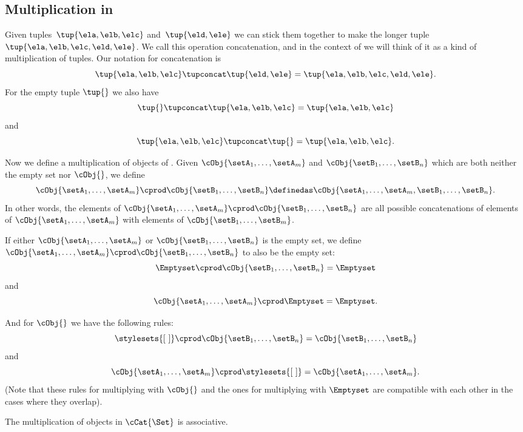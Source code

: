 \subsection{Multiplication in \cCat{\Set}}

Given tuples~$\tup{\ela, \elb, \elc}$ and~$\tup{\eld, \ele}$ we can stick them together to make the longer tuple~$\tup{\ela, \elb, \elc, \eld, \ele}$.
We call this operation concatenation, and in the context of \cCat{\Set} we will think of it as a kind of multiplication of tuples.
Our notation for concatenation is
\begin{equation*}
    \tup{\ela, \elb, \elc} \tupconcat \tup{\eld, \ele} = \tup{\ela, \elb, \elc, \eld, \ele}.
\end{equation*}
For the empty tuple $\tup{  }$ we also have
\begin{equation*}
    \tup{} \tupconcat \tup{\ela, \elb, \elc}  = \tup{\ela, \elb, \elc}
\end{equation*}
and
\begin{equation*}
    \tup{\ela, \elb, \elc}  \tupconcat \tup{ } = \tup{\ela, \elb, \elc}.
\end{equation*}

Now we define a multiplication of objects of \cCat{\Set}.
Given $\cObj{\setA_1, \dots, \setA_m}$ and $\cObj{\setB_1,  \dots, \setB_n}$ which are both neither the empty set nor $\cObj{}$, we define
\begin{equation}
    \cObj{\setA_1, \dots, \setA_m} \cprod \cObj{\setB_1, \dots, \setB_n} \definedas \cObj{\setA_1, \dots, \setA_m, \setB_1,  \dots, \setB_n}.
\end{equation}
In other words, the elements of $\cObj{\setA_1, \dots, \setA_m} \cprod \cObj{\setB_1, \dots, \setB_n}$ are all possible concatenations of elements of $\cObj{\setA_1, \dots, \setA_m}$ with elements of $\cObj{\setB_1, \dots, \setB_m}$.

If either $\cObj{\setA_1, \dots, \setA_m}$ or $\cObj{\setB_1, \dots, \setB_n}$ is the empty set, we define $\cObj{\setA_1, \dots, \setA_m} \cprod \cObj{\setB_1, \dots, \setB_n}$ to also be the empty set:
\begin{equation}
    \Emptyset \cprod \cObj{\setB_1, \dots, \setB_n} = \Emptyset
\end{equation}
and
\begin{equation}
    \cObj{\setA_1, \dots, \setA_m} \cprod \Emptyset = \Emptyset.
\end{equation}

And for $\cObj{}$ we have the following rules:
\begin{equation}
    \stylesets{[ \ ]} \cprod \cObj{\setB_1, \dots, \setB_n} = \cObj{\setB_1,  \dots, \setB_n}
\end{equation}
and
\begin{equation}
    \cObj{\setA_1, \dots, \setA_m} \cprod \stylesets{[ \ ]} = \cObj{\setA_1, \dots, \setA_m}.
\end{equation}
(Note that these rules for multiplying with $\cObj{}$ and the ones for multiplying with $\Emptyset$ are compatible with each other in the cases where they overlap).

\begin{remark}
    The multiplication of objects in $\cCat{\Set}$ is associative.
\end{remark}
